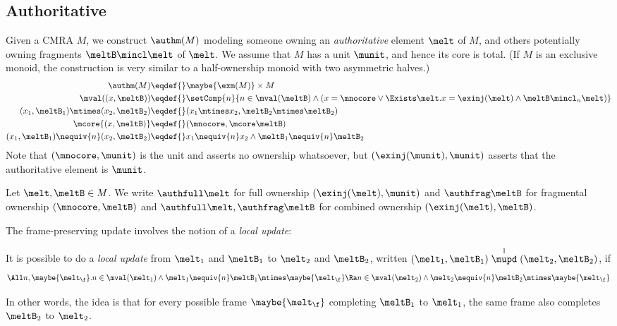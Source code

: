 \subsection{Authoritative}
\label{sec:auth-cmra}

Given a CMRA $M$, we construct $\authm(M)$ modeling someone owning an \emph{authoritative} element $\melt$ of $M$, and others potentially owning fragments $\meltB \mincl \melt$ of $\melt$.
We assume that $M$ has a unit $\munit$, and hence its core is total.
(If $M$ is an exclusive monoid, the construction is very similar to a half-ownership monoid with two asymmetric halves.)
\begin{align*}
\authm(M) \eqdef{}& \maybe{\exm(M)} \times M \\
\mval( (x, \meltB ) ) \eqdef{}& \setComp{ n }{ n \in \mval(\meltB) \land (x = \mnocore \lor \Exists \melt. x = \exinj(\melt) \land \meltB \mincl_n \melt) } \\
  (x_1, \meltB_1) \mtimes (x_2, \meltB_2) \eqdef{}& (x_1 \mtimes x_2, \meltB_2 \mtimes \meltB_2) \\
  \mcore{(x, \meltB)} \eqdef{}& (\mnocore, \mcore\meltB) \\
  (x_1, \meltB_1) \nequiv{n} (x_2, \meltB_2) \eqdef{}& x_1 \nequiv{n} x_2 \land \meltB_1 \nequiv{n} \meltB_2
\end{align*}
Note that $(\mnocore, \munit)$ is the unit and asserts no ownership whatsoever, but $(\exinj(\munit), \munit)$ asserts that the authoritative element is $\munit$.

Let $\melt, \meltB \in M$.
We write $\authfull \melt$ for full ownership $(\exinj(\melt), \munit)$ and $\authfrag \meltB$ for fragmental ownership $(\mnocore, \meltB)$ and $\authfull \melt , \authfrag \meltB$ for combined ownership $(\exinj(\melt), \meltB)$.

The frame-preserving update involves the notion of a \emph{local update}:
\newcommand\lupd{\stackrel{\mathrm l}{\mupd}}
\begin{defn}
  It is possible to do a \emph{local update} from $\melt_1$ and $\meltB_1$ to $\melt_2$ and $\meltB_2$, written $(\melt_1, \meltB_1) \lupd (\melt_2, \meltB_2)$, if
  \[ \All n, \maybe{\melt_\f}. n \in \mval(\melt_1) \land \melt_1 \nequiv{n} \meltB_1 \mtimes \maybe{\melt_\f} \Ra n \in \mval(\melt_2) \land \melt_2 \nequiv{n} \meltB_2 \mtimes \maybe{\melt_\f} \]
\end{defn}
In other words, the idea is that for every possible frame $\maybe{\melt_\f}$ completing $\meltB_1$ to $\melt_1$, the same frame also completes $\meltB_2$ to $\melt_2$.

